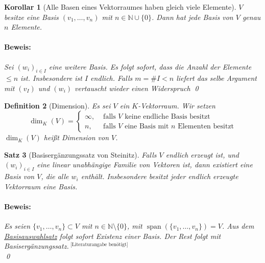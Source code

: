\documentclass{report}
\newcommand{\IN}[1]{\index{#1|BH}}
\newcommand{\N}{\mathbb{N}}
\DeclareMathOperator{\Span}{span}
\theoremstyle{customrem}
\theoremstyle{customdef}
\newtheorem{definition}{Definition}[chapter]
\newtheorem{korrolar}[definition]{Korollar}
\newtheorem{satz}[definition]{Satz}
\renewenvironment{proof}{\paragraph{Beweis: }}{\qed}
\begin{document}
	\begin{korrolar}[Alle Basen eines Vektorraumes haben gleich viele Elemente]
		\(V\) besitze eine Basis \((v_1, \dots, v_n)\) mit \(n \in \N \cup \{0\}\). Dann hat jede Basis von \(V\) genau \(n\) Elemente.\\
		
		\begin{proof}
			Sei \((w_i)_{i \in I}\) eine weitere Basis. Es folgt sofort, dass die Anzahl der Elemente \(\le n\) ist. Insbesondere ist \(I\) endlich. Falls \(m = \#I < n\) liefert das selbe Argument mit \((v_I)\) und \((w_i)\) vertauscht wieder einen Widerspruch \Lightning
		\end{proof}
	\end{korrolar}
	\vspace{.25cm}
	\begin{definition}[Dimension]
		\IN{Dimension}
		Es sei \(V\) ein \(K\)-Vektorraum. Wir setzen
		\[\dim_K(V) = \begin{cases}\infty,&\text{ falls \(V\) keine endliche Basis besitzt}\\n,&\text{ falls \(V\) eine Basis mit \(n\) Elementen besitzt}\end{cases}\]
		\(\dim_K(V)\) heißt Dimension von \(V\).
	\end{definition}
	
	\begin{satz}[Basisergänzungssatz von Steinitz]
		\label{satz218}
		Falls \(V\) endlich erzeugt ist, und \((w_i)_{i \in I}\) eine linear unabhängige Familie von Vektoren ist, dann existiert eine Basis von \(V\), die alle \(w_i\) enthält. Insbesondere besitzt jeder endlich erzeugte Vektorraum eine Basis.\\
		
		\begin{proof}
			Es seien \(\{v_1, \dots, v_n\} \subset V\) mit \(n \in \N \setminus\{0\}\), mit \(\Span(\{v_1, \dots, v_n\}) = V\). Aus dem \hyperref[satz213]{Basisauswahlsatz} folgt sofort Existenz einer Basis. Der Rest folgt mit Basisergänzungssatz.\(^{\text{ [Literaturangabe benötigt]}}\)\\
		\end{proof}
	\end{satz}
	
\end{document}
